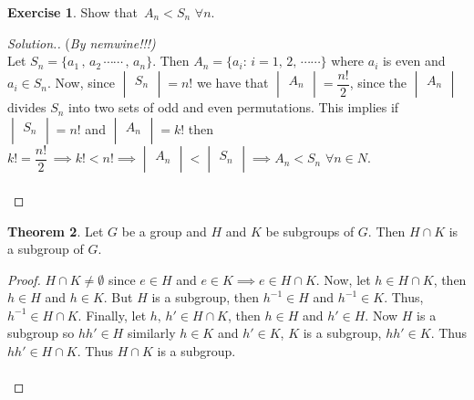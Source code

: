 \documentclass[11pt,a4paper]{article}
\theoremstyle{definition}
\newtheorem{thm}{Theorem}[subsection]
\newtheorem{exe}[thm]{Exercise}
\newenvironment{solution}
  {\renewcommand{\qedsymbol}{}\begin{proof}[\textit{Solution}.]}
  {\end{proof}}
\begin{document}
\begin{exe}
Show that $\, A_n < S_n \, \, \forall n$.\\

\begin{solution}
(\textit{By nemwine!!!)}\\
Let $S_n = \{a_1\, , \, a_2\, \cdots\cdots\, ,\, a_n\}$. Then $A_n = \{a_i:\, i = 1, \, 2, \, \cdots\cdots\}$ where $a_i$ is even and $a_i\in S_n$. Now, since $\begin{vmatrix}
S_n\\
\end{vmatrix} = n!$ we have that $\begin{vmatrix}
A_n\\
\end{vmatrix} = \dfrac{n!}{2}$, since the $\begin{vmatrix}
A_n\\
\end{vmatrix}$ divides $S_n$ into two sets of odd and even permutations. This implies if $\begin{vmatrix}
S_n\\
\end{vmatrix} = n!$ and $\begin{vmatrix}
A_n\\
\end{vmatrix} = k!$ then $k!  = \dfrac{n!}{2}\, \implies k! < n! \implies \begin{vmatrix}
A_n\\
\end{vmatrix} < \begin{vmatrix}
S_n\\
\end{vmatrix} \implies A_n < S_n\,\,\forall n\in N$.\\\\
\end{solution}
\end{exe}







\begin{thm}
Let $G$ be a group and $H$ and $K$ be subgroups of $G$. Then $H\cap K$ is a subgroup of $G$.\\
\end{thm}


\begin{proof}
$H\cap K\neq \emptyset$ since $e\in H$ and $e\in K\implies e\in H\cap K$. Now, let $h\in H\cap K$, then $h\in H$ and $h\in  K$. But $H$ is a subgroup, then $h^{-1}\in H$ and $h^{-1}\in K$. Thus, $h^{-1}\in H\cap K$. Finally, let $h,\,h'\in H\cap K$, then $h\in H$ and $h'\in H$. Now $H$ is a subgroup so $hh'\in H$ similarly $h\in K$ and $h'\in K$, $K$ is a subgroup, $hh'\in K$. Thus $hh'\in H\cap K$. Thus $H\cap K$ is a subgroup.\\\\
\end{proof}
\end{document}
